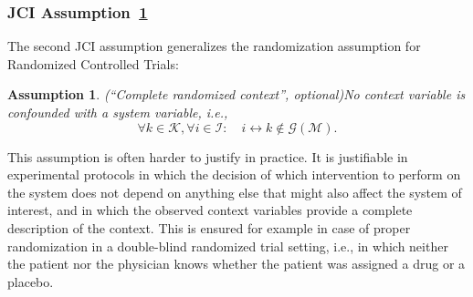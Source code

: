 \documentclass[twoside,11pt]{article}
\newcommand\C[1]{\mathcal{#1}}
\newtheorem{assumption}{Assumption}
\newcommand{\oto}{\leftrightarrow}
\newcommand{\Joris}[1]{{\color{blue}#1}}
\newcommand{\Sara}[1]{{\color{purple}#1}}
\newcommand{\Tom}[1] {{\color{green}#1}}
\begin{document}
\subsubsection{JCI Assumption~\ref{ass:unconfounded}}\label{sec:ass_unconfounded}
The second JCI assumption generalizes the randomization assumption for Randomized Controlled Trials:
\begin{assumption}(``Complete randomized context'', optional)\label{ass:unconfounded}
No context variable is confounded with a system variable, i.e.,
$$\forall k\in\C{K}, \forall i\in\C{I}: \quad i \oto k \notin \C{G}(\C{M}).$$
\end{assumption}
This assumption is often harder to justify in practice. 
It is justifiable in experimental protocols in which the decision of which intervention to perform on the system does not depend on 
anything else that might also affect the system of interest, and in which the observed context variables provide a complete description of the context. This is ensured for example in case of proper randomization in a double-blind randomized trial setting, i.e., in which neither the patient nor the physician knows whether the patient was assigned a drug or a placebo.
\end{document}
